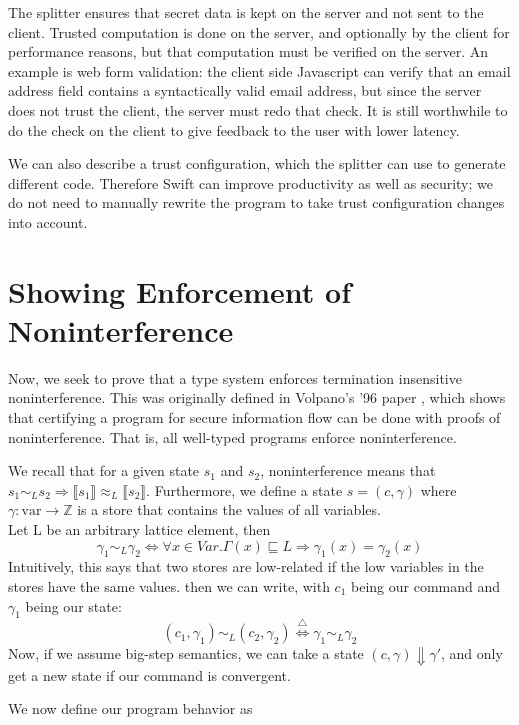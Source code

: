 \documentclass{article}
\begin{document}
The splitter ensures that secret data is kept on the server and not sent to the client. Trusted computation is done on the server, and optionally by the client for performance reasons, but that computation must be verified on the server. An example is web form validation: the client side Javascript can verify that an email address field contains a syntactically valid email address, but since the server does not trust the client, the server must redo that check. It is still worthwhile to do the check on the client to give feedback to the user with lower latency. 

We can also describe a trust configuration, which the splitter can use to generate different code. Therefore Swift can improve productivity as well as security; we do not need to manually rewrite the program to take trust configuration changes into account.

\section{Showing Enforcement of Noninterference}
Now, we seek to prove that a type system enforces termination insensitive noninterference. This was originally defined in Volpano's '96 paper \cite{volpano1996sound}, which shows that certifying a program for secure information flow can be done with proofs of noninterference. That is, all well-typed programs enforce noninterference.

We recall that for a given state $s_1$ and $s_2$, noninterference means that $s_1 \sim_L s_2 \Rightarrow{} \llbracket{} s_1 \rrbracket{} \approx_L \llbracket{} s_2\rrbracket{}$.
Furthermore, we define a state $s = (c, \gamma)$ where $\gamma : \text{var} \rightarrow{}  \mathbb{Z}$ is a store that contains the values of all variables.\\
Let L be  an arbitrary lattice element, then
\[\gamma_1 \sim_L \gamma_2 \Leftrightarrow \forall x \in Var. \Gamma(x) \sqsubseteq L \Rightarrow \gamma_1(x) =\gamma_2(x)\]
Intuitively, this says that two stores are low-related if the low variables in the stores have the same values. then we can write, with $c_1$ being our command and $\gamma_1$ being our state:
\[ (c_1, \gamma_1) \sim_L  (c_2, \gamma_2) \overset{\triangle}{\Leftrightarrow}\gamma_1 \sim_L \gamma_2\] 
Now, if we assume big-step semantics, we can take a state $(c, \gamma) \Downarrow \gamma'$, and only get a new state if our command is convergent. 

We now define our program behavior as 
\end{document}

